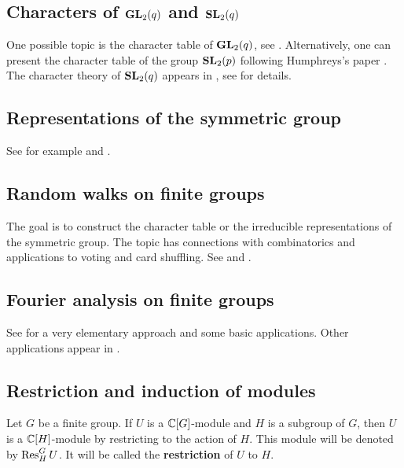 \subsection*{Characters of $\mathbf{GL}_2(q)$ and $\mathbf{SL}_2(q)$}

One possible topic is the character table of $\mathbf{GL}_2(q)$, see
\cite[\S5.2]{MR2867444}. Alternatively, one can 
present the character table of the group $\mathbf{SL}_2(p)$  
following Humphreys's paper \cite{MR364478}. 
The character theory of $\mathbf{SL}_2(q)$ appears in 
\cite[\S5.2]{MR2867444}, see 
\cite[Chapter 20]{MR1650707} for details. 

\subsection*{Representations of the symmetric group}

See for example \cite[\S10]{MR2867444} and 
\cite{MR1153249}. 

\subsection*{Random walks on finite groups}

The goal is to construct the character table or 
the irreducible representations of the symmetric group. 
The topic has connections with combinatorics and applications 
to voting and card shuffling. 
See \cite[4]{MR1153249} and \cite[\S11]{MR2867444}.

\subsection*{Fourier analysis on finite groups}

See \cite[\S5]{MR2867444} for a very elementary approach and some
basic applications. Other applications 
appear in \cite{MR1695775}.

\subsection*{Restriction and induction of modules}

\begin{definition}
    Let $G$ be a finite group. 
    If $U$ is a $\mathbb{C}[G]$-module and $H$ is a subgroup of $G$, 
    then $U$ is a $\mathbb{C}[H]$-module by restricting to the action of $H$.  
    This module will be denoted by $\operatorname{Res}_H^GU$. It will be called
    the \textbf{restriction} of $U$ to $H$.
\end{definition}

